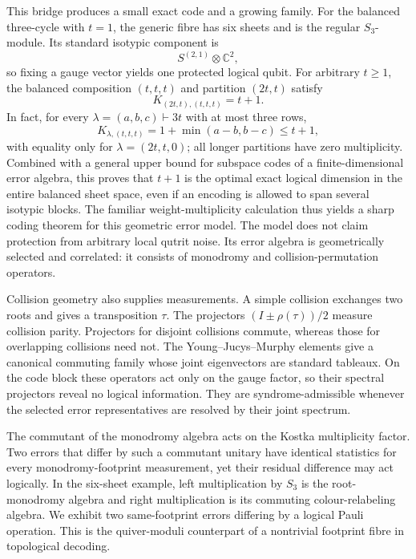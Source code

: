 \documentclass[11pt]{article}
\theoremstyle{definition}
\theoremstyle{remark}
\newcommand{\C}{\mathbb C}
\begin{document}
This bridge produces a small exact code and a growing family.  For the balanced three-cycle with $t=1$, the generic fibre has six sheets and is the regular $S_3$-module.  Its standard isotypic component is
\[
  S^{(2,1)}\otimes\C^2,
\]
so fixing a gauge vector yields one protected logical qubit.  For arbitrary $t\geq1$, the balanced composition $(t,t,t)$ and partition $(2t,t)$ satisfy
\[
  K_{(2t,t),(t,t,t)}=t+1.
\]
In fact, for every $\lambda=(a,b,c)\vdash3t$ with at most three rows,
\[
 K_{\lambda,(t,t,t)}=1+\min(a-b,b-c)\leq t+1,
\]
with equality only for $\lambda=(2t,t,0)$; all longer partitions have zero multiplicity.  Combined with a general upper bound for subspace codes of a finite-dimensional error algebra, this proves that $t+1$ is the optimal exact logical dimension in the entire balanced sheet space, even if an encoding is allowed to span several isotypic blocks.  The familiar weight-multiplicity calculation thus yields a sharp coding theorem for this geometric error model.  The model does not claim protection from arbitrary local qutrit noise.  Its error algebra is geometrically selected and correlated: it consists of monodromy and collision-permutation operators.

Collision geometry also supplies measurements.  A simple collision exchanges two roots and gives a transposition $\tau$.  The projectors $(I\pm\rho(\tau))/2$ measure collision parity.  Projectors for disjoint collisions commute, whereas those for overlapping collisions need not.  The Young--Jucys--Murphy elements give a canonical commuting family whose joint eigenvectors are standard tableaux.  On the code block these operators act only on the gauge factor, so their spectral projectors reveal no logical information.  They are syndrome-admissible whenever the selected error representatives are resolved by their joint spectrum.

The commutant of the monodromy algebra acts on the Kostka multiplicity factor.  Two errors that differ by such a commutant unitary have identical statistics for every monodromy-footprint measurement, yet their residual difference may act logically.  In the six-sheet example, left multiplication by $S_3$ is the root-monodromy algebra and right multiplication is its commuting colour-relabeling algebra.  We exhibit two same-footprint errors differing by a logical Pauli operation.  This is the quiver-moduli counterpart of a nontrivial footprint fibre in topological decoding.
\end{document}
